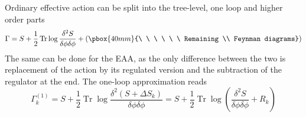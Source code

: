 \documentclass[11pt, a4paper]{article}
\begin{document}
Ordinary effective action can be split into the tree-level, one loop and higher order parts
\begin{equation}
    \Gamma = S + \frac{1}{2} \operatorname{Tr} \log{\frac{\delta^2 S}{\delta \phi \delta \phi}} + \left( \pbox{40mm}{\ \ \ \ \ \ Remaining \\ Feynman diagrams} \right)
\end{equation}
The same can be done for the EAA, as the only difference between the two is replacement of the action by its regulated version and
the subtraction of the regulator at the end. The one-loop approximation reads
\begin{equation}
    \Gamma_k^{(1)} = S + \frac{1}{2} \operatorname{Tr} \log{\frac{\delta^2 (S+\Delta S_k)}{\delta \phi \delta \phi}} = S + \frac{1}{2} \operatorname{Tr} \log{\left(\frac{\delta^2 S}{\delta \phi \delta \phi} + R_k\right)}
\end{equation}
\end{document}
